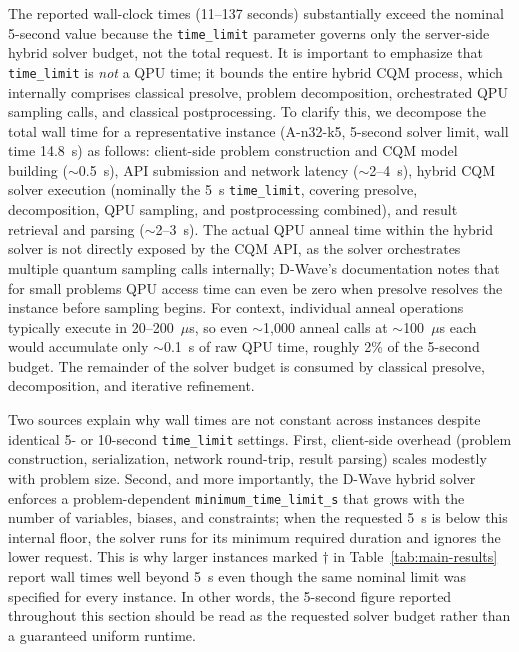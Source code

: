 \documentclass[preprint,3p,12pt,authoryear]{elsarticle}
\begin{document}
{\color{red}The reported wall-clock times (11--137 seconds) substantially exceed the nominal 5-second value because the \texttt{time\_limit} parameter governs only the server-side hybrid solver budget, not the total request. It is important to emphasize that \texttt{time\_limit} is \emph{not} a QPU time; it bounds the entire hybrid CQM process, which internally comprises classical presolve, problem decomposition, orchestrated QPU sampling calls, and classical postprocessing. To clarify this, we decompose the total wall time for a representative instance (A-n32-k5, 5-second solver limit, wall time 14.8~s) as follows: client-side problem construction and CQM model building ($\sim$0.5~s), API submission and network latency ($\sim$2--4~s), hybrid CQM solver execution (nominally the 5~s \texttt{time\_limit}, covering presolve, decomposition, QPU sampling, and postprocessing combined), and result retrieval and parsing ($\sim$2--3~s). The actual QPU anneal time within the hybrid solver is not directly exposed by the CQM API, as the solver orchestrates multiple quantum sampling calls internally; D-Wave's documentation notes that for small problems QPU access time can even be zero when presolve resolves the instance before sampling begins. For context, individual anneal operations typically execute in 20--200~$\mu$s, so even $\sim$1{,}000 anneal calls at $\sim$100~$\mu$s each would accumulate only $\sim$0.1~s of raw QPU time, roughly 2\% of the 5-second budget. The remainder of the solver budget is consumed by classical presolve, decomposition, and iterative refinement.

Two sources explain why wall times are not constant across instances despite identical 5- or 10-second \texttt{time\_limit} settings. First, client-side overhead (problem construction, serialization, network round-trip, result parsing) scales modestly with problem size. Second, and more importantly, the D-Wave hybrid solver enforces a problem-dependent \texttt{minimum\_time\_limit\_s} that grows with the number of variables, biases, and constraints; when the requested 5~s is below this internal floor, the solver runs for its minimum required duration and ignores the lower request. This is why larger instances marked $\dagger$ in Table~\ref{tab:main-results} report wall times well beyond 5~s even though the same nominal limit was specified for every instance. In other words, the 5-second figure reported throughout this section should be read as the requested solver budget rather than a guaranteed uniform runtime.}
\end{document}

